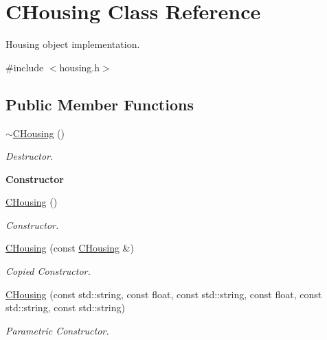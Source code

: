 \hypertarget{class_c_housing}{}\section{C\+Housing Class Reference}
\label{class_c_housing}


Housing object implementation.  




{\ttfamily \#include $<$housing.\+h$>$}

\subsection*{Public Member Functions}
\begin{DoxyCompactItemize}
\item 
\hyperlink{class_c_housing_a474b50df1af45c52228c7404ab18c528}{$\sim$\+C\+Housing} ()\hypertarget{class_c_housing_a474b50df1af45c52228c7404ab18c528}{}\label{class_c_housing_a474b50df1af45c52228c7404ab18c528}

\begin{DoxyCompactList}\small\item\em Destructor. \end{DoxyCompactList}\end{DoxyCompactItemize}
\begin{Indent}{\bf Constructor}\par
\begin{DoxyCompactItemize}
\item 
\hyperlink{class_c_housing_a1cbe126cc3f747dc7587a80d992473d7}{C\+Housing} ()
\begin{DoxyCompactList}\small\item\em Constructor. \end{DoxyCompactList}\item 
\hyperlink{class_c_housing_a914bdcd23b728124b169406b072386f6}{C\+Housing} (const \hyperlink{class_c_housing}{C\+Housing} \&)
\begin{DoxyCompactList}\small\item\em Copied Constructor. \end{DoxyCompactList}\item 
\hyperlink{class_c_housing_a5c593d9bb321d6aea9999c083a121c0d}{C\+Housing} (const std\+::string, const float, const std\+::string, const float, const std\+::string, const std\+::string)
\begin{DoxyCompactList}\small\item\em Parametric Constructor. \end{DoxyCompactList}\end{DoxyCompactItemize}
\end{Indent}
